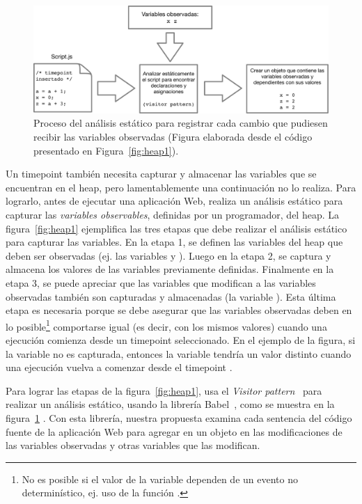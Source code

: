 \documentclass[conference]{IEEEtran}
\begin{document}
\begin{figure}[t]
\begin{center}
\includegraphics[width=1.0\linewidth]{fig-heap2}
\caption{Proceso del an\'alisis est\'atico para registrar cada cambio que pudiesen recibir las variables observadas (Figura elaborada desde el c\'odigo presentado en Figura~\ref{fig:heap1}).}
\label{fig:heap2}
\end{center}
\end{figure}

Un timepoint tambi\'en necesita capturar y almacenar las variables que se encuentran en el heap, pero lamentablemente una continuaci\'on no lo realiza. Para lograrlo, antes de ejecutar una aplicaci\'on Web, \deloreanjs realiza un an\'alisis est\'atico para capturar las {\em variables observables}, definidas por un programador, del heap. La figura~\ref{fig:heap1} ejemplifica las tres etapas que debe realizar el an\'alisis est\'atico para capturar las variables. En la etapa 1, se definen las variables del heap que deben ser observadas (ej. las variables  y ). Luego en la etapa 2, se captura y almacena los valores de las variables previamente definidas. Finalmente en la etapa 3, se puede apreciar que las variables que modifican a las variables observadas tambi\'en son capturadas y almacenadas (la variable ). Esta \'ultima etapa es necesaria porque se debe asegurar que las variables observadas deben en lo posible\footnote{No es posible si el valor de la variable dependen de un evento no determin\'istico, ej. uso de la funci\'on .} comportarse igual (es decir, con los mismos valores) cuando una ejecuci\'on comienza desde un timepoint seleccionado. En el ejemplo de la figura, si la variable  no es capturada, entonces la variable  tendr\'ia un valor distinto cuando una ejecuci\'on vuelva a comenzar desde el timepoint .          

Para lograr las etapas de la figura~\ref{fig:heap1}, \deloreanjs usa el {\em Visitor pattern}~\cite{GoF94} para realizar un an\'alisis est\'atico, usando la librer\'ia Babel~\cite{mckenzie:babel}, como se muestra en la figura~\ref{fig:heap2} . Con esta librer\'ia, nuestra propuesta examina cada sentencia del c\'odigo fuente de la aplicaci\'on Web para agregar en un objeto en \javascript las modificaciones de las variables observadas y otras variables que las modifican.
\end{document}
